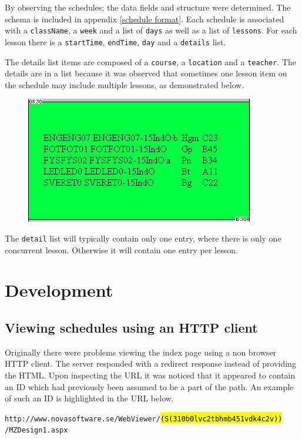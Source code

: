 \documentclass{article}
\begin{document}
	By observing the schedules; the data fields and structure were determined. The schema is included in  appendix \ref{schedule format}. Each schedule is associated with a \texttt{className}, a \texttt{week} and a list of \texttt{days} as well as a list of \texttt{lessons}.
	For each lesson there is a \texttt{startTime}, \texttt{endTime}, \texttt{day} and a \texttt{details} list.
	
	The details list items are composed of a \texttt{course}, a \texttt{location} and a \texttt{teacher}. The details are in a list because it was observed that sometimes one lesson item on the schedule may include multiple lessons, as demonstrated below.
	
	\begin{figure}[h]
		\centering
		\includegraphics[width=0.5\linewidth]{images/multiple-lessons}
		\caption{}
		\label{fig:multiple-lessons}
	\end{figure}
	
	The \texttt{detail} list will typically contain only one entry, where there is only one concurrent lesson. Otherwise it will contain one entry per lesson.
	
	\section{Development}
	
	\subsection{Viewing schedules using an HTTP client}
	Originally there were problems viewing the index page using a non browser HTTP client. The server responded with a redirect response instead of providing the HTML. Upon inspecting the URL it was noticed that it appeared to contain an ID which had previously been assumed to be a part of the path. An example of such an ID is highlighted in the URL below.
	
	\texttt{http://www.novasoftware.se/WebViewer/\hl{(S(310b0lvc2tbhmb451vdk4c2v))}\\/MZDesign1.aspx}
	
\end{document}
